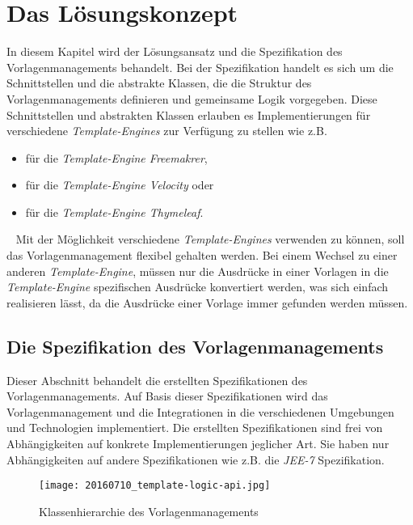 \chapter{Das Lösungskonzept}
\label{cha:Lösungskonzept}
In diesem Kapitel wird der Lösungsansatz und die Spezifikation des Vorlagenmanagements behandelt. Bei der Spezifikation handelt es sich um die Schnittstellen und die abstrakte Klassen, die die Struktur des Vorlagenmanagements definieren und gemeinsame Logik vorgegeben. Diese Schnittstellen und abstrakten Klassen erlauben es Implementierungen für verschiedene \emph{Template-Engines} zur Verfügung zu stellen wie z.B.
\begin{itemize}
	\item für die \emph{Template-Engine Freemakrer},
	\item für die \emph{Template-Engine Velocity} oder
	\item für die \emph{Template-Engine Thymeleaf}.
\end{itemize}
\ \newline
Mit der Möglichkeit verschiedene \emph{Template-Engines} verwenden zu können, soll das Vorlagenmanagement flexibel gehalten werden. Bei einem Wechsel zu einer anderen \emph{Template-Engine}, müssen nur die Ausdrücke in einer Vorlagen in die \emph{Template-Engine} spezifischen Ausdrücke konvertiert werden, was sich einfach realisieren lässt, da die Ausdrücke einer Vorlage immer gefunden werden müssen.

\section{Die Spezifikation des Vorlagenmanagements}
\label{sec:specification-template-management}
Dieser Abschnitt behandelt die erstellten Spezifikationen des Vorlagenmanagements. Auf Basis dieser Spezifikationen wird das Vorlagenmanagement und die Integrationen in die verschiedenen Umgebungen und Technologien implementiert. Die erstellten Spezifikationen sind frei von Abhängigkeiten auf konkrete Implementierungen jeglicher Art. Sie haben nur Abhängigkeiten auf andere Spezifikationen wie z.B. die \emph{JEE-7} Spezifikation.
\newpage

\begin{figure}[h]
\centering
\texttt{[image: 20160710\_template-logic-api.jpg]} %
\caption{Klassenhierarchie des Vorlagenmanagements}
\label{fig:template-logic-api-hierarchy}
\end{figure}

